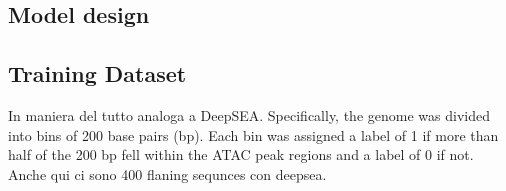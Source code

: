 \subsection*{Model design}


\subsection*{Training Dataset}

In maniera del tutto analoga a DeepSEA. Specifically, the genome was divided into bins of 200 base pairs (bp). Each bin was assigned a label of 1 if more than half of the 200 bp fell within the ATAC peak regions and a label of 0 if not. Anche qui ci sono 400 flaning sequnces con deepsea.
